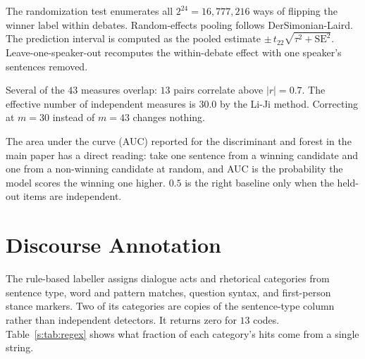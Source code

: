 \documentclass[pdflatex,sn-apa]{sn-jnl}%
\begin{document}
The randomization test enumerates all $2^{24} = 16{,}777{,}216$ ways of
flipping the winner label within debates. Random-effects pooling follows
DerSimonian-Laird. The prediction interval is computed as the pooled
estimate $\pm\, t_{22}\sqrt{\tau^2 + \mathrm{SE}^2}$. Leave-one-speaker-out
recomputes the within-debate effect with one speaker's sentences removed.

Several of the $43$ measures overlap: $13$ pairs correlate above $|r| =
0.7$. The effective number of independent measures is $30.0$ by the Li-Ji
method. Correcting at $m = 30$ instead of $m = 43$ changes nothing.

The area under the curve (AUC) reported for the discriminant and forest in
the main paper has a direct reading: take one sentence from a winning
candidate and one from a non-winning candidate at random, and AUC is the
probability the model scores the winning one higher. $0.5$ is the right
baseline only when the held-out items are independent.

\section{Discourse Annotation}
\label{s:tagging}

The rule-based labeller assigns dialogue acts and rhetorical categories from
sentence type, word and pattern matches, question syntax, and first-person
stance markers. Two of its categories are copies of the sentence-type column
rather than independent detectors. It returns zero for $13$ codes.
Table~\ref{s:tab:regex} shows what fraction of each category's hits come from
a single string.
\end{document}
